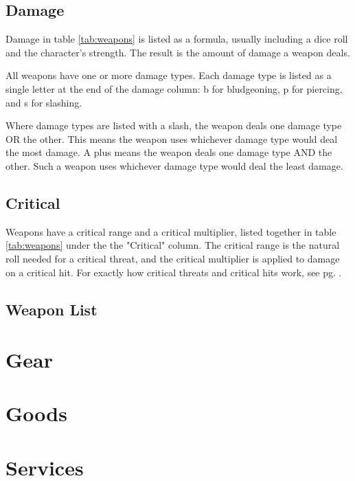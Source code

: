 \begin{multicols}{2}
    \subsection{Damage}
    Damage in table \ref{tab:weapons} is listed as a formula, usually
    including a dice roll and the character's strength. The result is the
    amount of damage a weapon deals.

    All weapons have one or more damage types. Each damage type is listed as
    a single letter at the end of the damage column: b for bludgeoning, p for
    piercing, and s for slashing.

    Where damage types are listed with a slash, the weapon deals one damage
    type OR the other. This means the weapon uses whichever damage type
    would deal the most damage. A plus means the weapon deals one damage
    type AND the other. Such a weapon uses whichever damage type would deal
    the least damage.

    \subsection{Critical}
    Weapons have a critical range and a critical multiplier, listed together
    in table \ref{tab:weapons} under the the "Critical" column. The critical
    range is the natural roll needed for a critical threat, and the critical
    multiplier is applied to damage on a critical hit. For exactly how critical
    threats and critical hits work, see pg. \pageref{combat:critical-hits}.

    \subsection{Weapon List}

    \section{Gear}

    \section{Goods}

    \section{Services}
\end{multicols}
